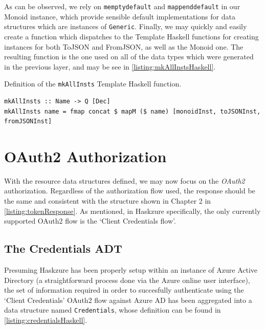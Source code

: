 \documentclass[11pt]{report}
\begin{document}
As can be observed, we rely on \texttt{memptydefault} and
\texttt{mappenddefault} in our Monoid instance, which provide sensible default
implementations for data structures which are instances of \texttt{Generic}.
\newline
Finally, we may quickly and easily create a function which dispatches to the
Template Haskell functions for creating instances for both ToJSON and FromJSON,
as well as the Monoid one. The resulting function is the one used on all of the
data types which were generated in the previous layer, and may be see in
\autoref{listing:mkAllInstsHaskell}.

\begin{listing}
\label{listing:mkAllInstsHaskell}
\caption{Definition of the \texttt{mkAllInsts} Template Haskell function.}
\begin{verbatim}
mkAllInsts :: Name -> Q [Dec]
mkAllInsts name = fmap concat $ mapM ($ name) [monoidInst, toJSONInst, fromJSONInst]
\end{verbatim}
\end{listing}

\section{OAuth2 Authorization} %

With the resource data structures defined, we may now focus on the
\textit{OAuth2} authorization. Regardless of the authorization flow used,
the response should be the same and consistent with the structure
shown in Chapter 2 in \autoref{listing:tokenResponse}. As mentioned, in Haskzure
specifically, the only currently supported OAuth2 flow is the `Client
Credentials flow'.

\subsection{The Credentials ADT}

Presuming Haskzure has been properly setup within an instance of Azure
Active Directory (a straightforward process done via the Azure online user
interface), the set of information required in order to succesfully
authenticate using the `Client Credentials' OAuth2 flow against Azure AD has
been aggregated into a data structure named \texttt{Credentials}, whose
definition can be found in \autoref{listing:credentialsHaskell}.
\end{document}
